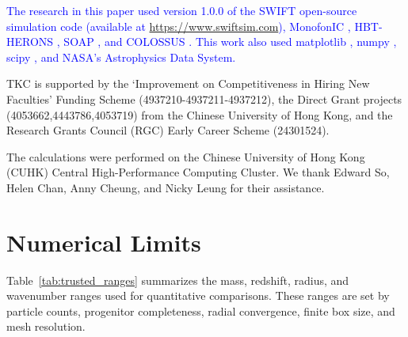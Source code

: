 \documentclass[
 reprint,
 superscriptaddress,
 nofootinbib,
 nobibnotes,
 amsmath,
 amssymb,
 aps,
 prd,
 floatfix,
 longbibliography
]{revtex4-2}
\DeclareRobustCommand{\change}[1]{\textcolor{blue}{#1}}
\begin{document}
\begin{acknowledgments}


\change{The research in this paper used version 1.0.0 of the {\small SWIFT} open-source simulation code \citep{Schaller2024SWIFT} (available at \url{https://www.swiftsim.com}), {\small MonofonIC} \citep{Hahn2020MUSIC2monofonIC,Michaux2021MUSIC2monofonIC}, {\small HBT-HERONS} \citep{Victor25HBTHERONS}, {\small SOAP} \citep{McGibbon2025SOAP}, and {\small COLOSSUS} \citep{Diemer2018}. This work also used matplotlib \citep{Hunt07matplotlib}, numpy \citep{vand11numpy}, scipy \citep{Virt20scipy}, and NASA's Astrophysics Data System.}


TKC is supported by the `Improvement on Competitiveness in Hiring New Faculties' Funding Scheme (4937210-4937211-4937212), the Direct Grant projects (4053662,4443786,4053719) from the Chinese University of Hong Kong, and the Research Grants Council (RGC) Early Career Scheme (24301524).

The calculations were performed on the Chinese University of Hong Kong (CUHK) Central High-Performance Computing Cluster. We thank Edward So, Helen Chan, Anny Cheung, and Nicky Leung for their assistance.

\end{acknowledgments}

\clearpage

\appendix

\section{\texorpdfstring{Numerical Limits}{Numerical Limits}}
\label{app:trusted_ranges}


Table~\ref{tab:trusted_ranges} summarizes the mass, redshift, radius, and wavenumber ranges used for quantitative comparisons. These ranges are set by particle counts, progenitor completeness, radial convergence, finite box size, and mesh resolution.
\end{document}

